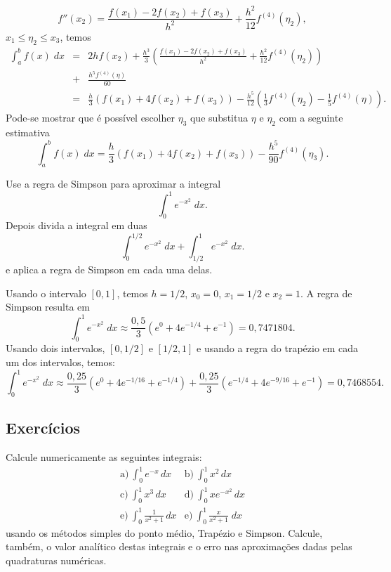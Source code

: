$$
f''(x_2)=\frac{f(x_1)-2f(x_2)+f(x_3)}{h^2}+\frac{h^2}{12}f^{(4)}(\eta_2),
$$
$x_1\leq \eta_2\leq x_3$, temos
\begin{eqnarray*}
\int_a^bf(x)\;dx&=&2hf(x_2)+\frac{h^3}{3}\left(\frac{f(x_1)-2f(x_2)+f(x_3)}{h^2}+\frac{h^2}{12}f^{(4)}(\eta_2)\right)\\
&+&\frac{h^5f^{(4)}(\eta)}{60}\\
&=&\frac{h}{3}\left(f(x_1)+4f(x_2)+f(x_3)\right)-\frac{h^5}{12}\left(\frac{1}{3}f^{(4)}(\eta_2)-\frac{1}{5}f^{(4)}(\eta)\right).
\end{eqnarray*}
Pode-se mostrar que é possível escolher $\eta_3$ que substitua $\eta$ e $\eta_2$ com a seguinte estimativa
$$
\int_a^bf(x)\;dx=\frac{h}{3}\left(f(x_1)+4f(x_2)+f(x_3)\right)-\frac{h^5}{90}f^{(4)}(\eta_3).
$$

\begin{ex}
Use a regra de Simpson para aproximar a integral
$$
\int_0^1e^{-x^2}\;dx.
$$
Depois divida a integral em duas
$$
\int_0^{1/2}e^{-x^2}\;dx+\int_{1/2}^{1}e^{-x^2}\;dx.
$$
e aplica a regra de Simpson em cada uma delas.
\end{ex}
Usando o intervalo $[0,1]$, temos $h=1/2$, $x_0=0$, $x_1=1/2$ e $x_2=1$. A regra de Simpson resulta em
$$
\int_0^1e^{-x^2}\;dx\approx \frac{0,5}{3}(e^{0}+4e^{-1/4}+e^{-1})=0,7471804.
$$
Usando dois intervalos, $[0,1/2]$ e $[1/2,1]$ e usando a regra do trapézio em cada um dos intervalos, temos:
$$
\int_0^1e^{-x^2}\;dx\approx \frac{0,25}{3}(e^{0}+4e^{-1/16}+e^{-1/4})+\frac{0,25}{3}(e^{-1/4}+4e^{-9/16}+e^{-1})=0,7468554.
$$

\subsection*{Exercícios}

\begin{exer}Calcule numericamente as seguintes integrais:
  \begin{eqnarray*}
    \text{a)}~\int_0^1e^{-x}\,dx & \text{b)}~\int_0^1x^2\,dx\\
    \text{c)}~\int_0^1x^3\,dx & \text{d)}~\int_0^1xe^{-x^2}\,dx\\
    \text{e)}~\int_0^1\frac{1}{x^2+1}\,dx &\text{e)}~\int_0^1\frac{x}{x^2+1}\;dx
  \end{eqnarray*}
usando os métodos simples do ponto médio, Trapézio e Simpson. Calcule, também, o valor analítico destas integrais e o erro nas aproximações dadas pelas quadraturas numéricas.
\end{exer}
%

